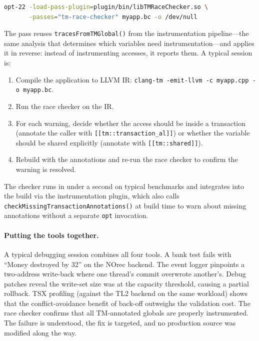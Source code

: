 \begin{lstlisting}[language=bash, caption={Running the race checker. \texttt{opt} is LLVM's mid-level optimizer driver (\texttt{opt-22} for LLVM~22); \texttt{myapp.bc} is LLVM bitcode, the compiler's internal representation of the program.}]
opt-22 -load-pass-plugin=plugin/bin/libTMRaceChecker.so \
       -passes="tm-race-checker" myapp.bc -o /dev/null
\end{lstlisting}

\noindent
The pass reuses \texttt{tracesFromTMGlobal()} from the instrumentation
pipeline---the same analysis that determines which variables need
instrumentation---and applies it in reverse: instead of instrumenting
accesses, it reports them.  A typical session is:

\begin{enumerate}
    \item Compile the application to LLVM IR: \texttt{clang-tm
          -emit-llvm -c myapp.cpp -o myapp.bc}.
    \item Run the race checker on the IR.
    \item For each warning, decide whether the access should be inside a
          transaction (annotate the caller with
          \texttt{[[tm::transaction\_al]]}) or whether the variable
          should be shared explicitly (annotate with
          \texttt{[[tm::shared]]}).
    \item Rebuild with the annotations and re-run the race checker to
          confirm the warning is resolved.
\end{enumerate}

The checker runs in under a second on typical benchmarks and integrates
into the build via the instrumentation plugin, which also calls
\texttt{checkMissingTransactionAnnotations()} at build time to warn
about missing annotations without a separate \texttt{opt} invocation.

\paragraph{Putting the tools together.}
A typical debugging session combines all four tools.  A bank test fails
with ``Money destroyed by 32'' on the NOrec backend.  The event logger
pinpoints a two-address write-back where one thread's commit overwrote
another's.  Debug patches reveal the write-set size was at the
capacity threshold, causing a partial rollback.  TSX profiling
(against the TL2 backend on the same workload) shows that the
conflict-avoidance benefit of back-off outweighs the validation cost.
The race checker confirms that all TM-annotated globals are properly
instrumented.  The failure is understood, the fix is targeted, and no
production source was modified along the way.
